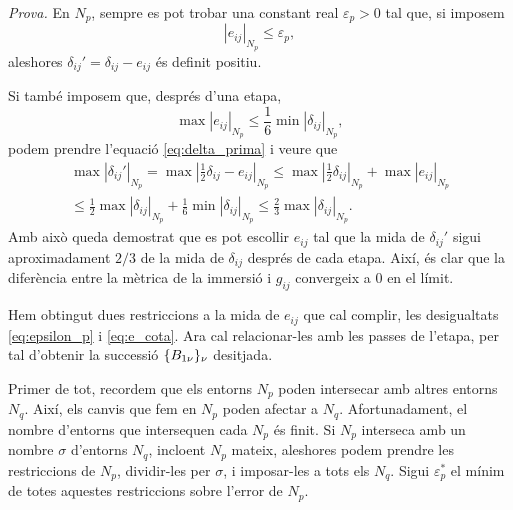 {\color{green!50!black} \textit{Prova.} 
En $N_p$, sempre es pot trobar una constant real $\varepsilon_p>0$ tal que, si imposem 
\begin{equation}\label{eq:epsilon_p}
    |e_{ij}|_{N_p} \le \varepsilon_p,
\end{equation}
aleshores $\delta_{ij}'= \delta_{ij} - e_{ij}$ és definit positiu.

Si també imposem que, després d'una etapa,
\begin{equation}\label{eq:e_cota}
    \max|e_{ij}|_{N_p} \le \frac16\min|\delta_{ij}|_{N_p},
\end{equation}
podem prendre l'equació \ref{eq:delta_prima} i veure que
\begin{align}\label{eq:delta_prima_cota}
    \nonumber\max|\delta_{ij}'|_{N_p} = \max\left|\frac12\delta_{ij} - e_{ij}\right|_{N_p} \le \max\left|\frac12\delta_{ij}\right|_{N_p} + \max|e_{ij}|_{N_p} \\
    \le \frac12\max|\delta_{ij}|_{N_p} + \frac16\min|\delta_{ij}|_{N_p} \le \frac23\max|\delta_{ij}|_{N_p}.
\end{align}
Amb això queda demostrat que es pot escollir $e_{ij}$ tal que la mida de $\delta_{ij}'$ sigui aproximadament $2/3$ de la mida de $\delta_{ij}$ després de cada etapa. Així, és clar que la diferència entre la mètrica de la immersió i $g_{ij}$ convergeix a $0$ en el límit.

Hem obtingut dues restriccions a la mida de $e_{ij}$ que cal complir, les desigualtats \ref{eq:epsilon_p} i \ref{eq:e_cota}. Ara cal relacionar-les amb les passes de l'etapa, per tal d'obtenir la successió $\{B_{1\nu}\}_{\nu}$ desitjada. 

Primer de tot, recordem que els entorns $N_p$ poden intersecar amb altres entorns $N_q$. Així, els canvis que fem en $N_p$ poden afectar a $N_q$. Afortunadament, el nombre d'entorns que intersequen cada $N_p$ és finit. Si $N_p$ interseca amb un nombre $\sigma$ d'entorns $N_q$, incloent $N_p$ mateix, aleshores podem prendre les restriccions de $N_p$, dividir-les per $\sigma$, i imposar-les a tots els $N_q$. Sigui $\varepsilon_p^*$ el mínim de totes aquestes restriccions sobre l'error de $N_p$.

}
